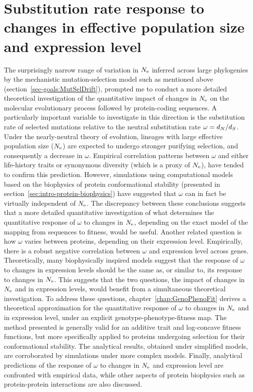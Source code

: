 \section{Substitution rate response to changes in effective population size and expression level}
\label{sec-goals:GenoPhenoFit}

The surprisingly narrow range of variation in $N_{\text{e}}$ inferred across large phylogenies by the mechanistic mutation-selection model such as mentioned above (section~\ref{sec-goals:MutSelDrift}), prompted me to conduct a more detailed theoretical investigation of the quantitative impact of changes in $N_{\text{e}}$ on the molecular evolutionary process followed by protein-coding sequences.
A particularly important variable to investigate in this direction is the \gls{substitution} rate of selected mutations relative to the \gls{neutral} \gls{substitution} rate $\omega = d_N / d_S$.
Under the \gls{nearly-neutral} theory of evolution, lineages with large \gls{effective population size} ($N_{\text{e}}$) are expected to undergo stronger purifying selection, and consequently a decrease in $\omega$.
Empirical correlation patterns between $\omega$ and either life-history traits or \gls{synonymous} diversity (which is a proxy of $N_{\text{e}}$), have tended to confirm this prediction.
However, simulations using computational models based on the biophysics of protein conformational stability (presented in section~\ref{sec:intro-protein-biophysics}) have suggested that $\omega$ can in fact be virtually independent of $N_{\text{e}}$.
The discrepancy between these conclusions suggests that a more detailed quantitative investigation of what determines the quantitative response of $\omega$ to changes in $N_{\text{e}}$, depending on the exact model of the mapping from sequences to fitness, would be useful.
Another related question is how $\omega$ varies between proteins, depending on their expression level.
Empirically, there is a robust negative correlation between $\omega$ and expression level across genes.
Theoretically, many biophysically inspired models suggest that the response of $\omega$ to changes in expression levels should be the same as, or similar to, its response to changes in $N_{\text{e}}$.
This suggests that the two questions, the impact of changes in $N_{\text{e}}$ and in expression levels, would benefit from a simultaneous theoretical investigation.
To address these questions, chapter~\ref{chap:GenoPhenoFit} derives a theoretical approximation for the quantitative response of $\omega$ to changes in $N_{\text{e}}$ and in expression level, under an explicit genotype-phenotype-fitness map.
The method presented is generally valid for an additive trait and log-concave fitness functions, but more specifically applied to proteins undergoing selection for their conformational stability.
The analytical results, obtained under simplified models, are corroborated by simulations under more complex models.
Finally, analytical predictions of the response of $\omega$ to changes in $N_{\text{e}}$ and expression level are confronted with empirical data, while other aspects of protein biophysics such as protein-protein interactions are also discussed.